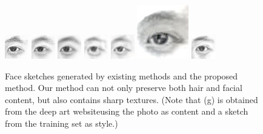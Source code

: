 \documentclass[10pt,twocolumn,letterpaper]{article}
\begin{document}
\begin{figure}[t]
\begin{minipage}[t]{1\linewidth}
\includegraphics[width=0.11\linewidth]{img/page1_example/eye_mrf.png}
\includegraphics[width=0.11\linewidth]{img/page1_example/eye_wmrf.png}
\includegraphics[width=0.11\linewidth]{img/page1_example/eye_ssd.png}
\includegraphics[width=0.11\linewidth]{img/page1_example/eye_fcnn.png}
\includegraphics[width=0.11\linewidth]{img/page1_example/eye_bfcn.png}
\includegraphics[width=0.11\linewidth]{img/page1_example/eye_deepart.jpg}
\includegraphics[width=0.11\linewidth]{img/page1_example/eye_ours1.png}
\end{minipage}
\caption[Caption for LOF]{Face sketches generated by existing methods and the proposed method. Our method can not only preserve both hair and facial content, but also contains sharp textures. %
(Note that (g) is obtained from the deep art website\setcounter{footnote}{0}\footnotemark using the photo as content and a sketch from the training set as style.)}
\label{fig:example_comp}
\end{figure}
\end{document}

